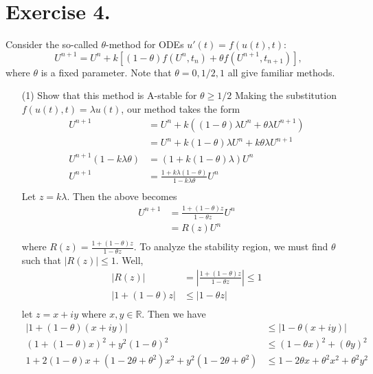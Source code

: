 \documentclass{article}
\begin{document}
\section*{Exercise 4.}
Consider the so-called $\theta$-method for ODEs $u'(t) = f(u(t),t)$:
\[U^{n+1} = U^n + k[(1-\theta)f(U^n,t_n) + \theta f(U^{n+1}, t_{n+1})],\]
where $\theta$ is a fixed parameter. Note that $\theta = 0, 1/2, 1$ all give familiar methods.
\begin{itemize}
    \item[(1)] Show that this method is A-stable for $\theta \geq 1/2$
    \newline\newline
    Making the substitution $f(u(t),t) = \lambda u(t)$, our method takes the form
    \begin{align*}
        U^{n+1} &= U^n + k((1-\theta)\lambda U^n + \theta \lambda U^{n+1}) \\
        &= U^n + k(1-\theta)\lambda U^n + k\theta\lambda U^{n+1} \\
        U^{n+1}(1 - k\lambda\theta) &= (1+k(1-\theta)\lambda)U^n \\ 
        U^{n+1} &= \frac{1 + k\lambda(1 - \theta)}{1 - k\lambda\theta}U^n \\
    \end{align*}
    Let $z = k\lambda$. Then the above becomes
    \begin{align*}
        U^{n+1} &= \frac{1 + (1-\theta)z}{1 - \theta z}U^n \\
        &= R(z)U^n \\
    \end{align*}
    where $R(z) = \frac{1 + (1-\theta)z}{1 - \theta z}$. To analyze the stability region, we must find $\theta$ such that $|R(z)| \leq 1$. Well,
    \begin{align*}
        |R(z)| &= \left| \frac{1 + (1 - \theta)z}{1 - \theta z}\right| \leq 1\\
        |1 + (1 - \theta)z| &\leq |1 - \theta z| \\
    \end{align*}
    let $z = x + iy$ where $x,y \in \mathbb{R}$. Then we have
    \begin{align*}
        |1 + (1 - \theta)(x + iy)| &\leq |1 - \theta(x + iy)| \\
        (1 + (1-\theta)x)^2 + y^2(1-\theta)^2 &\leq (1-\theta x)^2 + (\theta y)^2 \\
        1 + 2(1-\theta)x + (1 - 2\theta + \theta^2)x^2 + y^2(1 - 2\theta + \theta^2) &\leq 1 - 2\theta x + \theta^2x^2 + \theta^2y^2 \\

\end{align*}
\end{itemize}
\end{document}
